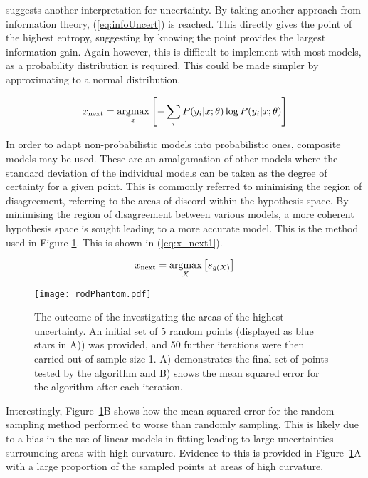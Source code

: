 \textcite{Set09} suggests another interpretation for uncertainty. By taking another approach from information theory, (\ref{eq:infoUncert}) is reached. This directly gives the point of the highest entropy, suggesting by knowing the point provides the largest information gain. Again however, this is difficult to implement with most models, as a probability distribution is required. This could be made simpler by approximating to a normal distribution.

\begin{equation}
    \label{eq:infoUncert}
    x_\mathrm{next}=\operatorname*{argmax}_x{\left[-\sum_i{P(y_i|x;\theta)\log{P(y_i|x;\theta)}}\right]}
\end{equation}


In order to adapt non-probabilistic models into probabilistic ones, composite models may be used. These are an amalgamation of other models where the standard deviation of the individual models can be taken as the degree of certainty for a given point. This is commonly referred to minimising the region of disagreement, referring to the areas of discord within the hypothesis space. By minimising the region of disagreement between various models, a more coherent hypothesis space is sought leading to a more accurate model. This is the method used in Figure \ref{fig:rodPhantom}. This is shown in (\ref{eq:x_next1}).

\begin{equation}
    \label{eq:x_next1}
    x_\mathrm{next}=\operatorname*{argmax}_X{\left[s_{g(X)}\right]}
\end{equation}

\begin{figure}[H]
    \begin{center}
        \texttt{[image: rodPhantom.pdf]}
        \caption[Uncertainty Sampling Demonstration]{The outcome of the investigating the areas of the highest uncertainty. An initial set of 5 random points (displayed as blue stars in A)) was provided, and 50 further iterations were then carried out of sample size 1. A) demonstrates the final set of points tested by the algorithm and B) shows the mean squared error for the algorithm after each iteration.}
        \label{fig:rodPhantom}
    \end{center}
\end{figure}

Interestingly, Figure~\ref{fig:rodPhantom}B shows how the mean squared error for the random sampling method performed to worse than randomly sampling. This is likely due to a bias in the use of linear models in fitting leading to large uncertainties surrounding areas with high curvature. Evidence to this is provided in Figure~\ref{fig:rodPhantom}A with a large proportion of the sampled points at areas of high curvature.


